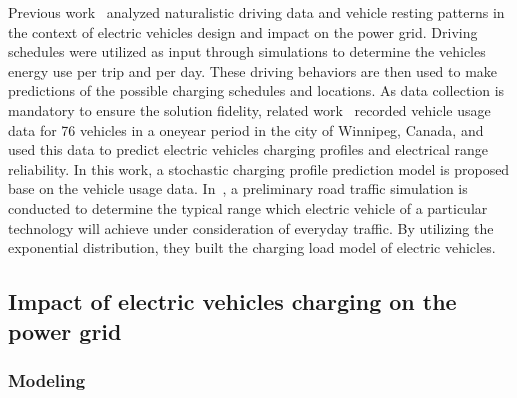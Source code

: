 Previous work~\cite{YC_Adornato10} analyzed naturalistic driving data and vehicle resting patterns in the context of electric vehicles design and impact on the power grid. 
Driving schedules were utilized as input through simulations to determine the vehicles energy use per trip and per day. 
These driving behaviors are then used to make predictions of the possible charging schedules and locations.
As data collection is mandatory to ensure the solution fidelity, related work~\cite{YC_Ashtari11} recorded vehicle usage data for 76 vehicles in a one{\textendash}year period in the city of Winnipeg, Canada, and used this data to predict electric vehicles charging profiles and electrical range reliability. In this work, a stochastic charging profile prediction model is proposed base on the vehicle usage data.
In~\cite{YC_Zhao12}, a preliminary road traffic simulation is conducted to determine the typical range which electric vehicle of a particular technology will achieve under consideration of everyday traffic. By utilizing the exponential distribution, they built the charging load model of electric vehicles.

\subsection{Impact of electric vehicles charging on the power grid}

\subsubsection{Modeling}
 
